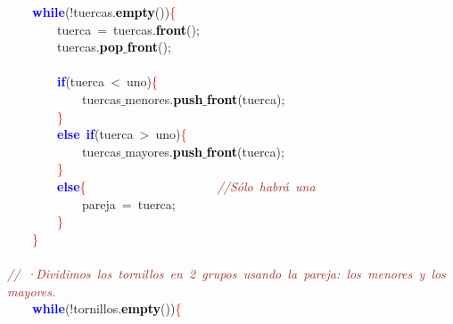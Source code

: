 \mbox{}\ \ \ \ \textbf{\textcolor{Blue}{while}}\textcolor{BrickRed}{(!}tuercas\textcolor{BrickRed}{.}\textbf{\textcolor{Black}{empty}}\textcolor{BrickRed}{())}\textcolor{Red}{\{} \\
\mbox{}\ \ \ \ \ \ \ \ tuerca\ \textcolor{BrickRed}{=}\ tuercas\textcolor{BrickRed}{.}\textbf{\textcolor{Black}{front}}\textcolor{BrickRed}{();} \\
\mbox{}\ \ \ \ \ \ \ \ tuercas\textcolor{BrickRed}{.}\textbf{\textcolor{Black}{pop$\_$front}}\textcolor{BrickRed}{();} \\
\mbox{} \\
\mbox{}\ \ \ \ \ \ \ \ \textbf{\textcolor{Blue}{if}}\textcolor{BrickRed}{(}tuerca\ \textcolor{BrickRed}{\textless{}}\ uno\textcolor{BrickRed}{)}\textcolor{Red}{\{} \\
\mbox{}\ \ \ \ \ \ \ \ \ \ \ \ tuercas$\_$menores\textcolor{BrickRed}{.}\textbf{\textcolor{Black}{push$\_$front}}\textcolor{BrickRed}{(}tuerca\textcolor{BrickRed}{);} \\
\mbox{}\ \ \ \ \ \ \ \ \textcolor{Red}{\}} \\
\mbox{}\ \ \ \ \ \ \ \ \textbf{\textcolor{Blue}{else}}\ \textbf{\textcolor{Blue}{if}}\textcolor{BrickRed}{(}tuerca\ \textcolor{BrickRed}{\textgreater{}}\ uno\textcolor{BrickRed}{)}\textcolor{Red}{\{} \\
\mbox{}\ \ \ \ \ \ \ \ \ \ \ \ tuercas$\_$mayores\textcolor{BrickRed}{.}\textbf{\textcolor{Black}{push$\_$front}}\textcolor{BrickRed}{(}tuerca\textcolor{BrickRed}{);} \\
\mbox{}\ \ \ \ \ \ \ \ \textcolor{Red}{\}} \\
\mbox{}\ \ \ \ \ \ \ \ \textbf{\textcolor{Blue}{else}}\textcolor{Red}{\{}\ \ \ \ \ \ \ \ \ \ \ \ \ \ \ \ \ \ \ \ \ \textit{\textcolor{Brown}{//Sólo\ habrá\ una}} \\
\mbox{}\ \ \ \ \ \ \ \ \ \ \ \ pareja\ \textcolor{BrickRed}{=}\ tuerca\textcolor{BrickRed}{;} \\
\mbox{}\ \ \ \ \ \ \ \ \textcolor{Red}{\}} \\
\mbox{}\ \ \ \ \textcolor{Red}{\}} \\
\mbox{} \\
\mbox{}\textit{\textcolor{Brown}{//\ ·Dividimos\ los\ tornillos\ en\ 2\ grupos\ usando\ la\ pareja:\ los\ menores\ y\ los\ mayores.}} \\
\mbox{}\ \ \ \ \textbf{\textcolor{Blue}{while}}\textcolor{BrickRed}{(!}tornillos\textcolor{BrickRed}{.}\textbf{\textcolor{Black}{empty}}\textcolor{BrickRed}{())}\textcolor{Red}{\{} \\

